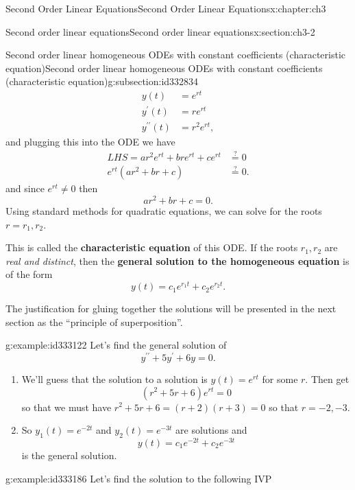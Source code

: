 \documentclass[oneside,10pt,]{book}
\newcommand{\terminology}[1]{\textbf{#1}}
\numberwithin{equation}{section}
\numberwithin{equation}{section}
\newcommand{\amp}{&}
\begin{document}
\begin{chapterptx}{Second Order Linear Equations}{}{Second Order Linear Equations}{}{}{x:chapter:ch3}
\begin{sectionptx}{Second order linear equations}{}{Second order linear equations}{}{}{x:section:ch3-2}
\begin{subsectionptx}{Second order linear homogeneous ODEs with constant coefficients (characteristic equation)}{}{Second order linear homogeneous ODEs with constant coefficients (characteristic equation)}{}{}{g:subsection:id332834}
\begin{align*}
y(t) \amp =e^{rt}\\
y^{\prime}(t) \amp =re^{rt}\\
y^{\prime\prime}(t) \amp =r^{2}e^{rt},
\end{align*}
and plugging this into the ODE we have%
\begin{align*}
LHS=ar^{2}e^{rt}+bre^{rt}+ce^{rt} \amp \overset{?}{=}0\\
e^{rt}\left(ar^{2}+br+c\right) \amp \overset{?}{=}0.
\end{align*}
and since \(e^{rt}\neq0\) then%
\begin{equation*}
ar^{2}+br+c=0.
\end{equation*}
Using standard methods for quadratic equations, we can solve for the roots \(r=r_{1},r_{2}\).%
\par
This is called the \terminology{characteristic equation} of this ODE. If the roots \(r_1, r_2\) are \emph{real and distinct}, then the \terminology{general solution to the homogeneous equation} is of the form%
\begin{equation*}
y(t)=c_{1}e^{r_{1}t}+c_{2}e^{r_{2}t}.
\end{equation*}
%
\par
The justification for gluing together the solutions will be presented in the next section as the ``principle of superposition''.%
\begin{example}{}{g:example:id333122}%
Let's find the general solution of%
\begin{equation*}
y^{\prime\prime}+5y^{\prime}+6y=0.
\end{equation*}
%
%
\begin{enumerate}
\item{}We'll guess that the solution to a solution is \(y(t)=e^{rt}\) for some \(r\). Then get%
\begin{equation*}
\left(r^{2}+5r+6\right)e^{rt}=0
\end{equation*}
so that we must have \(r^{2}+5r+6=\left(r+2\right)\left(r+3\right)=0\) so that \(r=-2,-3\).%
\item{}So \(y_{1}(t)=e^{-2t}\) and \(y_{2}(t)=e^{-3t}\) are solutions and%
\begin{equation*}
y(t)=c_{1}e^{-2t}+c_{2}e^{-3t}
\end{equation*}
is the general solution.%
\end{enumerate}
\end{example}
\begin{example}{}{g:example:id333186}%
Let's find the solution to the following IVP%

\end{example}
\end{subsectionptx}
\end{sectionptx}
\end{chapterptx}
\end{document}
